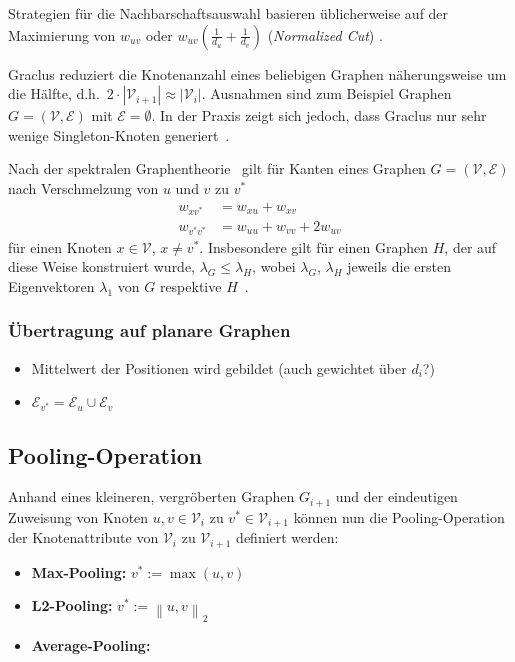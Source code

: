 Strategien für die Nachbarschaftsauswahl basieren üblicherweise auf der Maximierung von $w_{uv}$ oder $w_{uv}\left( \frac{1}{d_u} + \frac{1}{d_v} \right)$ (\emph{Normalized Cut}) .

Graclus reduziert die Knotenanzahl eines beliebigen Graphen näherungsweise um die Hälfte, d.h.\ $2 \cdot |\mathcal{V}_{i+1}| \approx |\mathcal{V}_i|$.
Ausnahmen sind zum Beispiel Graphen $G = (\mathcal{V}, \mathcal{E})$ mit $\mathcal{E} = \emptyset$.
In der Praxis zeigt sich jedoch, dass Graclus nur sehr wenige Singleton-Knoten generiert~\cite{Defferrard}.

Nach der spektralen Graphentheorie~\cite{Chung} gilt für Kanten eines Graphen $G = (\mathcal{V}, \mathcal{E})$ nach Verschmelzung von $u$ und $v$ zu $v^*$
\begin{align}
  w_{xv^*} &= w_{xu} + w_{xv}\\
  w_{v^*v^*} &= w_{uu} + w_{vv} + 2w_{uv}
\end{align}
für einen Knoten $x \in \mathcal{V}$, $x \neq v^*$.
Insbesondere gilt für einen Graphen $H$, der auf diese Weise konstruiert wurde, $\lambda_G \leq \lambda_H$, wobei $\lambda_G$, $\lambda_H$ jeweils die ersten Eigenvektoren $\lambda_1$ von $G$ respektive $H$~\cite{Chung}.

\subsubsection{Übertragung auf planare Graphen}

\begin{itemize}
  \item Mittelwert der Positionen wird gebildet (auch gewichtet über $d_i$?)
  \item $\mathcal{E}_{v^*} = \mathcal{E}_u \cup \mathcal{E}_v$ 
\end{itemize}

\subsection{Pooling-Operation}

Anhand eines kleineren, vergröberten Graphen $G_{i+1}$ und der eindeutigen Zuweisung von Knoten $u, v \in \mathcal{V}_i$ zu $v^* \in \mathcal{V}_{i+1}$ können nun die Pooling-Operation der Knotenattribute von $\mathcal{V}_{i}$ zu $\mathcal{V}_{i+1}$ definiert werden:

\begin{itemize}
  \item \textbf{Max-Pooling:} $v^* := \max(u, v)$
  \item \textbf{L2-Pooling:} $v^* := \left\| u, v \right\|_2$
  \item \textbf{Average-Pooling:} 
\end{itemize}

